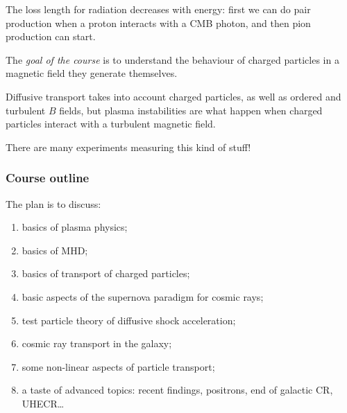 \documentclass[main.tex]{subfiles}
\begin{document}
The loss length for radiation decreases with energy: first we can do pair production when
a proton interacts with a CMB photon, and then pion production can start. 

The \emph{goal of the course} is to understand the behaviour of 
charged particles in a magnetic field they generate themselves. 

Diffusive transport  takes into account charged particles, as well 
as ordered and turbulent \(B\) fields, but 
plasma instabilities are what happen when charged particles interact with a 
turbulent magnetic field. 

There are many experiments measuring this kind of stuff! 

\subsubsection*{Course outline}

The plan is to discuss:
\begin{enumerate}
    \item basics of plasma physics;
    \item basics of MHD;
    \item basics of transport of charged particles;
    \item basic aspects of the supernova paradigm for cosmic rays;
    \item test particle theory of diffusive shock acceleration;
    \item cosmic ray transport in the galaxy;
    \item some non-linear aspects of particle transport;
    \item a taste of advanced topics: 
        recent findings, positrons, end of galactic CR, UHECR\dots
\end{enumerate}
\end{document}
